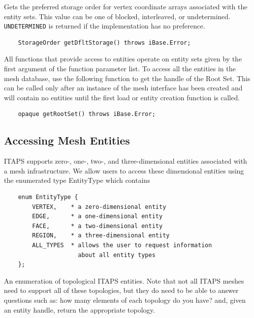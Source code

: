 \documentclass{article}
\begin{document}
Gets the preferred storage order for vertex coordinate arrays 
associated with the entity sets. This value can be one of blocked, 
interleaved, or undetermined. {\tt UNDETERMINED} is returned if the 
implementation has no preference.
\begin{verbatim} 
    StorageOrder getDfltStorage() throws iBase.Error;
\end{verbatim}


All functions that provide access to entities operate on entity 
sets given by the first argument of the function parameter list. 
To access all the entities in the mesh database, use the following 
function to get the handle of the Root Set. This can be called 
only after an instance of the mesh interface has been created 
and will contain no entities until the first load or entity creation function 
is called.
\begin{verbatim}
    opaque getRootSet() throws iBase.Error;
\end{verbatim}


\subsection{Accessing Mesh Entities}

ITAPS supports zero-, one-, two-, and three-dimensional entities 
associated with a mesh infrastructure. We allow users to access 
these dimensional entities using the enumerated type EntityType 
which contains 


\begin{verbatim}
    enum EntityType { 
        VERTEX,    * a zero-dimensional entity 
        EDGE,      * a one-dimensional entity
        FACE,      * a two-dimensional entity
        REGION,    * a three-dimensional entity 
        ALL_TYPES  * allows the user to request information 
                     about all entity types
    };
\end{verbatim}

An enumeration of topological ITAPS entities. Note that not all 
ITAPS meshes need to support all of these topologies, but they 
do need to be able to answer questions such as: how many elements 
of each topology do you have? and, given an entity handle, return 
the appropriate topology. 
\end{document}

